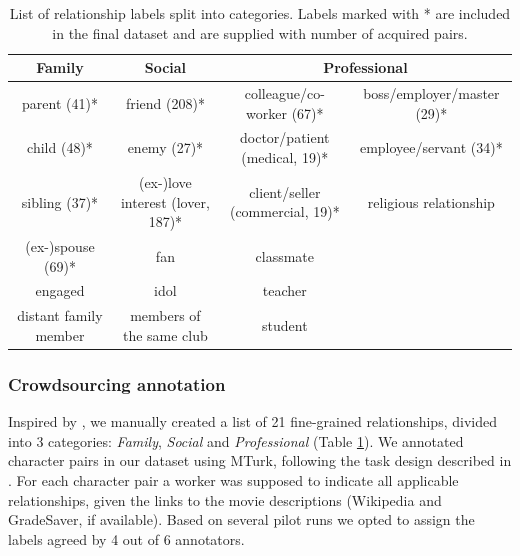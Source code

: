 \begin{table}[h!]\sffamily
\centering
\begin{adjustbox}{width=0.95\textwidth}
\begin{tabular}{cccc}
\textbf{Family}       & \textbf{Social}          & \multicolumn{2}{c}{\textbf{Professional}}  \\ \toprule
parent (41)*                & friend (208)*                   & colleague/co-worker (67)*  &  boss/employer/master (29)* \\
child (48)*                 & enemy (27)*                    & doctor/patient (medical, 19)*       &  employee/servant (34)* \\
sibling (37)*               & (ex-)love interest (lover, 187)*       & client/seller (commercial, 19)*        &  religious relationship \\
(ex-)spouse (69)*           & fan                      & classmate       \\
engaged               & idol                     & teacher                \\
distant family member & members of the same club & student                \\
\end{tabular}
\end{adjustbox}
\caption[List of relationship labels split into categories.]{List of relationship labels split into categories. Labels marked with * are included in the final dataset and are supplied with number of acquired pairs.}
\label{relation-list}
\end{table}

\subsubsection{Crowdsourcing annotation}

Inspired by \citet{massey2015annotating}, we manually created a list of 21 fine-grained relationships, divided into 3 categories: \emph{Family}, \emph{Social} and \emph{Professional} (Table \ref{relation-list}). %
We annotated character pairs in our dataset using MTurk, following the task design described in \citet{massey2015annotating}. For each character pair a worker was supposed to indicate all applicable relationships, given the links to the movie descriptions (Wikipedia and \gls{GradeSaver}, if available). Based on several pilot runs we opted to assign the labels agreed by 4 out of 6 annotators.

